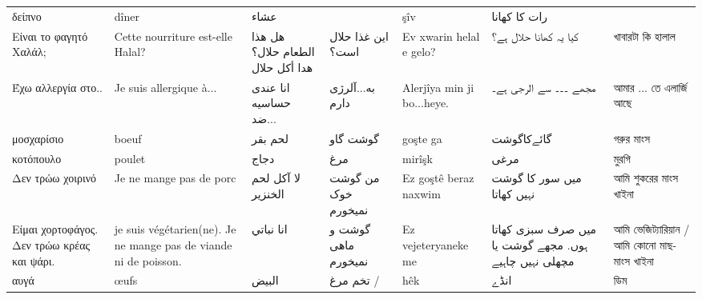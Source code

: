 \begin{longtable}{p{3.5cm} p{3.5cm} p{3.5cm} p{3.5cm} p{3.5cm} p{3.5cm} p{3.5cm} }
 δείπνο                                     & dîner                                                            & عشاء                             &                     & şîv                        & رات کا کهانا                                          &                                             \\
 Είναι το φαγητό Χαλάλ;                     & Cette nourriture est-elle Halal?                                 & هل هذا الطعام حلال؟ هدا أكل حلال & این غذا حلال است؟   & Ev xwarin helal e gelo?    & کیا یہ کھانا حلال ہے؟                                 & খাবারটা কি হালাল                            \\
 Έχω αλλεργία στο..                         & Je suis allergique à...                                          & انا عندی حساسیە ضد...            & به...آلرژی دارم     & Alerjîya min ji bo...heye. & مجھے ۔۔۔ سے الرجی ہے۔                                 & আমার ... তে এলার্জি আছে                     \\
 μοσχαρίσιο                                 & boeuf                                                            & لحم بقر                          & گوشت گاو            & goşte ga                   & گائےکاگوشت                                            & গরুর মাংস                                   \\
 κοτόπουλο                                  & poulet                                                           & دجاج                             & مرغ                 & mirîşk                     & مرغی                                                  & মুরগি                                       \\
 Δεν τρώω χοιρινό                           & Je ne mange pas de porc                                          & لا آكل لحم الخنزير               & من گوشت خوک نمیخورم & Ez goştê beraz naxwim      & میں سور کا گوشت نہیں کھاتا                            & আমি শুকরের মাংস খাইনা                       \\
 Είμαι χορτοφάγος. Δεν τρώω κρέας και ψάρι. & je suis végétarien(ne). Je ne mange pas de viande ni de poisson. & انا نباتي                        & گوشت و ماهی نمیخورم & Ez vejeteryaneke me        & میں صرف سبزی کھاتا ہوں. مجھے گوشت یا مچھلی نہیں چاہیے & আমি ভেজিট্যারিয়ান / আমি কোনো মাছ-মাংস খাইনা \\
 αυγά                                       & œufs                                                             & البيض                            & تخم مرغ  /          & hêk                        & انڈے                                                  & ডিম                                         \\

\end{longtable}
